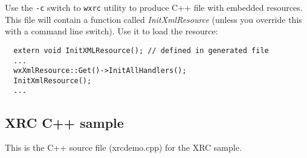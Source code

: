 Use the {\tt -c} switch to
{\tt wxrc} utility to produce C++ file with embedded resources. This file will
contain a function called {\it InitXmlResource} (unless you override this with
a command line switch). Use it to load the resource:

\begin{verbatim}
  extern void InitXMLResource(); // defined in generated file
  ...
  wxXmlResource::Get()->InitAllHandlers();
  InitXmlResource();
  ...
\end{verbatim}

\subsection{XRC C++ sample}\label{xrccppsample}

This is the C++ source file (xrcdemo.cpp) for the XRC sample.

